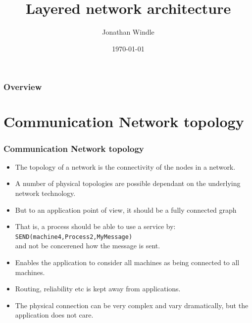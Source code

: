 \documentclass{beamer}
\title[Layered network architecture]{Layered network architecture} %
\author{Jonathan Windle} %
\institute[UEA] %
{
University of East Anglia \\ %
\medskip
\textit{J.Windle@uea.ac.uk} %
}
\date{\today} %
\begin{document}
\begin{frame}
\titlepage %
\end{frame}

\begin{frame}[allowframebreaks]
\frametitle{Overview} %
\tableofcontents %
\end{frame}
\section{Communication Network topology}
\begin{frame}
\frametitle{Communication Network topology}
\begin{itemize}
\item The {\color{red} topology} of a network is the connectivity of the {\color{green} nodes} in a network.
\item A number of physical {\color{red} topologies} are possible dependant on the underlying network technology.
\item But to an application point of view, it should be a fully connected graph
\item That is, a process should be able to use a service by:\\
\texttt{\color{orange}SEND(machine4,Process2,MyMessage)}\\
and not be concerened how the message is sent.
\item Enables the application to consider all machines as being connected to all machines. 
\item Routing, reliability etc is kept away from applications.
\item The physical connection can be very complex and vary dramatically, but the application does not care.
\end{itemize}
\end{frame}
\end{document}
